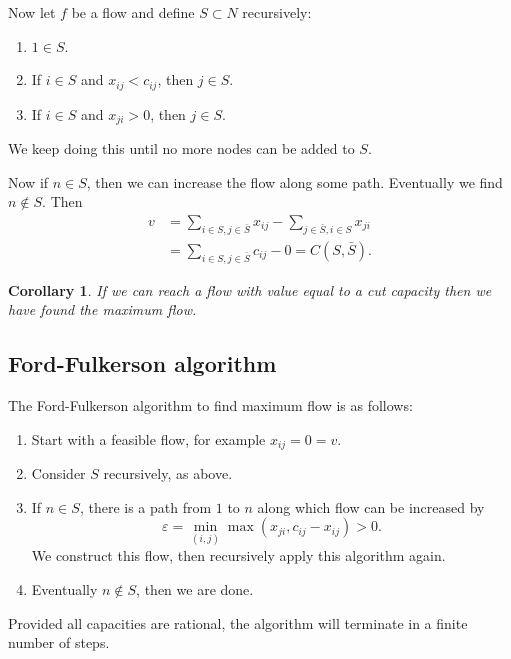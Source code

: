 \documentclass[12pt]{article}
\newtheorem{corollary}{Corollary}[section]
\theoremstyle{definition}
\theoremstyle{remark}
\begin{document}
\begin{adjustbox}{minipage = \columnwidth - 25.5pt, margin=1em, frame=1pt, margin=0em}
Now let $f$ be a flow and define $S \subset N$ recursively:
\begin{enumerate}[(1)]
	\item $1 \in S$.
	\item If $i \in S$ and $x_{ij} < c_{ij}$, then $j \in S$.
	\item If $i \in S$ and $x_{ji} > 0$, then $j \in S$.
\end{enumerate}
We keep doing this until no more nodes can be added to $S$.

Now if $n \in S$, then we can increase the flow along some path. Eventually we find $n \not \in S$. Then
\begin{align*}
	v &= \sum_{i \in S, j \in \bar S}x_{ij} - \sum_{j \in \bar S, i \in S}x_{ji} \\
	  &= \sum_{i \in S, j \in \bar S}c_{ij} - 0 = C(S, \bar S).
\end{align*}
\end{adjustbox}

\begin{corollary}
	If we can reach a flow with value equal to a cut capacity then we have found the maximum flow.
\end{corollary}

\subsection{Ford-Fulkerson algorithm}%
\label{sub:ford_fulkerson_algorithm}

The Ford-Fulkerson algorithm to find maximum flow is as follows:
\begin{enumerate}[1)]
	\item Start with a feasible flow, for example $x_{ij} = 0 = v$.
	\item Consider $S$ recursively, as above.
	\item If $n \in S$, there is a path from $1$ to $n$ along which flow can be increased by
		\[
			\varepsilon = \min_{(i,j)} \max \left(x_{ji}, c_{ij} - x_{ij}\right) > 0
		.\]
		We construct this flow, then recursively apply this algorithm again.
	\item Eventually $n \not \in S$, then we are done.
\end{enumerate}

Provided all capacities are rational, the algorithm will terminate in a finite number of steps.
\end{document}
